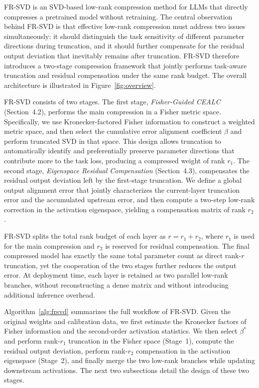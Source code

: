 \documentclass[a4paper,fleqn]{cas-dc}
\begin{document}


FR-SVD is an SVD-based low-rank compression method for LLMs that directly compresses a pretrained model without retraining. The central observation behind FR-SVD is that effective low-rank compression must address two issues simultaneously: it should distinguish the task sensitivity of different parameter directions during truncation, and it should further compensate for the residual output deviation that inevitably remains after truncation. FR-SVD therefore introduces a two-stage compression framework that jointly performs task-aware truncation and residual compensation under the same rank budget. The overall architecture is illustrated in Figure~\ref{fig:overview}.

FR-SVD consists of two stages. The first stage, \emph{Fisher-Guided CEALC} (Section~4.2), performs the main compression in a Fisher metric space. Specifically, we use Kronecker-factored Fisher information to construct a weighted metric space, and then select the cumulative error alignment coefficient $\beta$ and perform truncated SVD in that space. This design allows truncation to automatically identify and preferentially preserve parameter directions that contribute more to the task loss, producing a compressed weight of rank $r_1$. The second stage, \emph{Eigenspace Residual Compensation} (Section~4.3), compensates the residual output deviation left by the first-stage truncation. We define a global output alignment error that jointly characterizes the current-layer truncation error and the accumulated upstream error, and then compute a two-step low-rank correction in the activation eigenspace, yielding a compensation matrix of rank $r_2$.

FR-SVD splits the total rank budget of each layer as $r = r_1 + r_2$, where $r_1$ is used for the main compression and $r_2$ is reserved for residual compensation. The final compressed model has exactly the same total parameter count as direct rank-$r$ truncation, yet the cooperation of the two stages further reduces the output error. At deployment time, each layer is retained as two parallel low-rank branches, without reconstructing a dense matrix and without introducing additional inference overhead.

Algorithm~\ref{alg:frsvd} summarizes the full workflow of FR-SVD. Given the original weights and calibration data, we first estimate the Kronecker factors of Fisher information and the second-order activation statistics. We then select $\beta^*$ and perform rank-$r_1$ truncation in the Fisher space (Stage~1), compute the residual output deviation, perform rank-$r_2$ compensation in the activation eigenspace (Stage~2), and finally merge the two low-rank branches while updating downstream activations. The next two subsections detail the design of these two stages.
\end{document}
